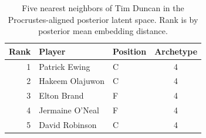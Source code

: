 \begin{table}[htbp]
  \centering\small
  \begin{tabular}{rllc}
    \toprule
    Rank & Player & Position & Archetype \\
    \midrule
    1 & Patrick Ewing & C & 4 \\
    2 & Hakeem Olajuwon & C & 4 \\
    3 & Elton Brand & F & 4 \\
    4 & Jermaine O'Neal & F & 4 \\
    5 & David Robinson & C & 4 \\
    \bottomrule
  \end{tabular}
  \caption{Five nearest neighbors of Tim Duncan in the Procrustes-aligned posterior latent space. Rank is by posterior mean embedding distance.}
  \label{tab:Tim_Duncan_neighbors}
\end{table}

